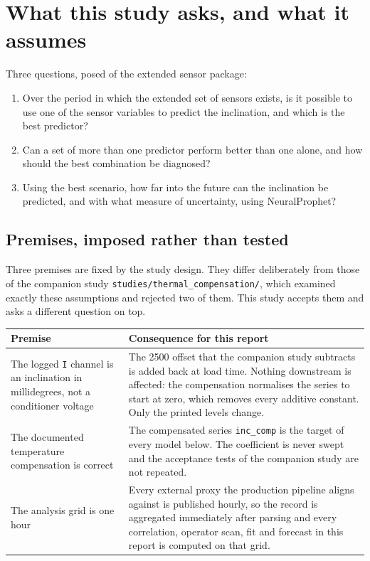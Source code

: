 \documentclass[11pt,a4paper]{article}
\begin{document}
\tableofcontents

\section{What this study asks, and what it assumes}

Three questions, posed of the extended sensor package:

\begin{enumerate}
\item Over the period in which the extended set of sensors exists, is it
possible to use one of the sensor variables to predict the inclination, and
which is the best predictor?
\item Can a set of more than one predictor perform better than one alone, and
how should the best combination be diagnosed?
\item Using the best scenario, how far into the future can the inclination be
predicted, and with what measure of uncertainty, using NeuralProphet?
\end{enumerate}

\subsection{Premises, imposed rather than tested}

Three premises are fixed by the study design. They differ deliberately from
those of the companion study \texttt{studies/thermal\_compensation/}, which
examined exactly these assumptions and rejected two of them. This study accepts
them and asks a different question on top.

\begin{center}
\begin{tabularx}{\textwidth}{L{4.6cm}Y}
\toprule
\textbf{Premise} & \textbf{Consequence for this report} \\
\midrule
The logged \texttt{I} channel is an inclination in millidegrees, not a
conditioner voltage &
The 2500 offset that the companion study subtracts is added back at load time.
Nothing downstream is affected: the compensation normalises the series to start
at zero, which removes every additive constant. Only the printed levels change.
\\
The documented temperature compensation is correct &
The compensated series \texttt{inc\_comp} is the target of every model below.
The coefficient is never swept and the acceptance tests of the companion study
are not repeated. \\
The analysis grid is one hour &
Every external proxy the production pipeline aligns against is published hourly,
so the record is aggregated immediately after parsing and every correlation,
operator scan, fit and forecast in this report is computed on that grid. \\
\bottomrule
\end{tabularx}
\end{center}
\end{document}
